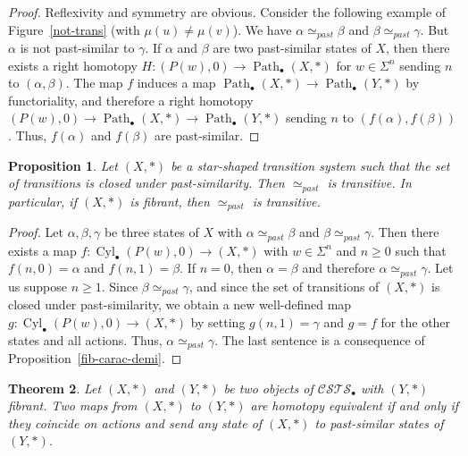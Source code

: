 \documentclass[a4paper,12pt]{amsart}
\newtheorem{thm}{Theorem}[section]
\newtheorem{prop}[thm]{Proposition}
\begin{document}
\begin{proof} Reflexivity and symmetry are obvious.  Consider the following
example of Figure~\ref{not-trans} (with $\mu(u) \neq \mu(v)$).  We
have $\alpha \simeq_{past} \beta$ and $\beta \simeq_{past}
\gamma$. But $\alpha$ is not past-similar to $\gamma$.  If $\alpha$
and $\beta$ are two past-similar states of $X$, then there exists a
right homotopy $H:(P(w),0) \to \operatorname{{Path}}_\bullet(X,*)$ for $w\in
\Sigma^n$ sending $n$ to $(\alpha,\beta)$. The map $f$ induces a map
$\operatorname{{Path}}_\bullet(X,*) \to \operatorname{{Path}}_\bullet(Y,*)$ by functoriality, and
therefore a right homotopy $(P(w),0) \to \operatorname{{Path}}_\bullet(X,*) \to
\operatorname{{Path}}_\bullet(Y,*)$ sending $n$ to $(f(\alpha),f(\beta))$. Thus,
$f(\alpha)$ and $f(\beta)$ are past-similar.  \end{proof}

\begin{prop} \label{pastsim-transitive} Let $(X,*)$ be a star-shaped transition
system such that the set of transitions is closed under
past-similarity. Then $\simeq_{past}$ is transitive. In particular, if
$(X,*)$ is fibrant, then $\simeq_{past}$ is transitive. \end{prop}

\begin{proof} Let $\alpha,\beta,\gamma$ be three states of $X$ with $\alpha
\simeq_{past} \beta$ and $\beta\simeq_{past} \gamma$. Then there
exists a map $f:\operatorname{{Cyl}}_\bullet(P(w),0) \to (X,*)$ with $w\in \Sigma^n$
and $n{\geqslant} 0$ such that $f(n,0)=\alpha$ and $f(n,1)=\beta$. If $n=0$,
then $\alpha=\beta$ and therefore $\alpha \simeq_{past} \gamma$. Let
us suppose $n{\geqslant} 1$. Since $\beta\simeq_{past} \gamma$, and since the
set of transitions of $(X,*)$ is closed under past-similarity, we
obtain a new well-defined map $g:\operatorname{{Cyl}}_\bullet(P(w),0) \to (X,*)$ by
setting $g(n,1)=\gamma$ and $g=f$ for the other states and all
actions.  Thus, $\alpha \simeq_{past} \gamma$. The last sentence is a
consequence of Proposition~\ref{fib-carac-demi}.  \end{proof}

\begin{thm} \label{car_homeq-2} Let $(X,*)$ and $(Y,*)$ be two objects of
${\mathcal{C\!S\!T\!S}}_\bullet$ with $(Y,*)$ fibrant. Two maps from $(X,*)$ to $(Y,*)$
are homotopy equivalent if and only if they coincide on actions and
send any state of $(X,*)$ to past-similar states of $(Y,*)$.  \end{thm}
\end{document}
